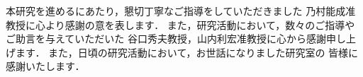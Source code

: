 \documentclass[tanilab-enum]{graduate}
\begin{document}
\acknowledgment\label{acknowledgement} %


本研究を進めるにあたり，懇切丁寧なご指導をしていただきました
乃村能成准教授に心より感謝の意を表します．
また，研究活動において，数々のご指導やご助言を与えていただいた
谷口秀夫教授，山内利宏准教授に心から感謝申し上げます．
また，日頃の研究活動において，お世話になりました研究室の
皆様に感謝いたします．





\end{document}
